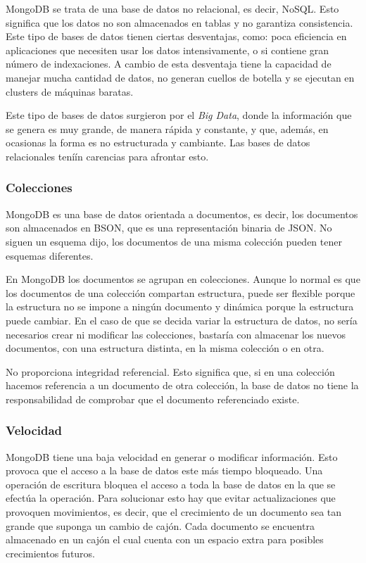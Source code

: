 \documentclass[a4paper, 12pt]{book}
\begin{document}
MongoDB\cite{MongoDB} se trata de una base de datos no relacional, es decir, NoSQL. Esto significa que los datos no
son almacenados en tablas y no garantiza consistencia. Este tipo de bases de datos tienen ciertas
desventajas, como: poca eficiencia en aplicaciones que necesiten usar los datos intensivamente,
o si contiene gran n\'umero de indexaciones. A cambio de esta desventaja tiene la capacidad de
manejar mucha cantidad de datos, no generan cuellos de botella y se ejecutan en clusters de
m\'aquinas baratas.

Este tipo de bases de datos surgieron por el \emph{Big Data}, donde la informaci\'on que se genera
es muy grande, de manera r\'apida y constante, y que, adem\'as, en ocasionas la forma es no
estructurada y cambiante. Las bases de datos relacionales ten\'i\'in carencias para afrontar esto.

\subsubsection{Colecciones}
\label{subsec:estilo}

MongoDB es una base de datos orientada a documentos, es decir, los documentos son almacenados
en BSON, que es una representaci\'on binaria de JSON. No siguen un esquema dijo,
los documentos de una misma colecci\'on pueden tener esquemas diferentes.

En MongoDB los documentos se agrupan en colecciones. Aunque lo normal es que los documentos
de una colecci\'on compartan estructura, puede ser flexible porque la estructura no se
impone a ning\'un documento y din\'amica porque la estructura puede cambiar. En el caso de que se
decida variar la estructura de datos, no ser\'ia necesarios crear ni modificar las colecciones, bastar\'ia con almacenar los nuevos documentos, con una estructura distinta, en la misma colecci\'on
o en otra.

No proporciona integridad referencial. Esto significa que, si en una colecci\'on hacemos referencia
a un documento de otra colecci\'on, la base de datos no tiene la responsabilidad de comprobar
que el documento referenciado existe.


\subsubsection{Velocidad}
\label{subsec:estilo}

MongoDB tiene una baja velocidad en generar o modificar informaci\'on. Esto provoca que
el acceso a la base de datos este m\'as tiempo bloqueado. Una operaci\'on de escritura bloquea el
acceso a toda la base de datos en la que se efect\'ua la operaci\'on. Para solucionar esto hay que
evitar actualizaciones que provoquen movimientos, es decir, que el crecimiento de un documento
sea tan grande que suponga un cambio de caj\'on. Cada documento se encuentra almacenado
en un caj\'on el cual cuenta con un espacio extra para posibles crecimientos futuros.
\end{document}
